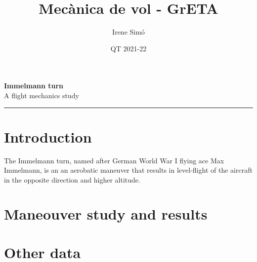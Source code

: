 \documentclass[10pt, twoside]{report}
\title{Mecànica de vol - GrETA}
\author{Irene Simó}
\date{QT 2021-22}
\begin{document}
\thispagestyle{empty} 
	\begin{center}
	\LARGE \textbf{Immelmann turn}\\
	\Large A flight mechanics study
	
	\vspace{1cm}	
	\hrule
	\end{center}
	
	\normalsize
	\begin{multicols}{2}
	\vspace*{-2cm}
	\tableofcontents
	\section*{Introduction}
	The Immelmann turn, named after German World War I flying ace Max Immelmann, is an an  aerobatic maneuver that results in level-flight of the aircraft in the opposite direction and higher altitude.
	
	
	\lipsum[1-2]
	
	\clearpage
	\section*{Maneouver study and results}
	\section*{Other data}
	\end{multicols}
\end{document}
